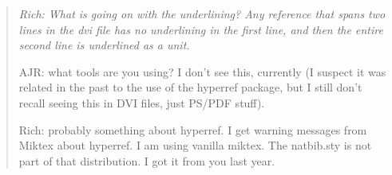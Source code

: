 \documentclass{article}
\def\url#1{\stexttt{#1}} %
\newcommand{\stexttt}[1]{{\small\texttt{#1}}}
\newenvironment{Comment}{\begin{quote}\small\itshape }{\end{quote}}
\begin{document}
\begin{Comment}
  Rich: What is going on with the underlining?  Any reference that spans
two lines in the dvi file has no underlining in the first line, and then the
entire second line is underlined as a unit.

AJR: what tools are you using?  I don't see this, currently (I suspect
it was related in the past to the use of the hyperref package, but I
still don't recall seeing this in DVI files, just PS/PDF stuff).

Rich: probably something about hyperref.  I get warning messages from
Miktex about hyperref.  I am using vanilla miktex.  The natbib.sty is
not part of that distribution.  I got it from you last year.

%
%
%
%
%
%

\end{Comment}
\end{document}
